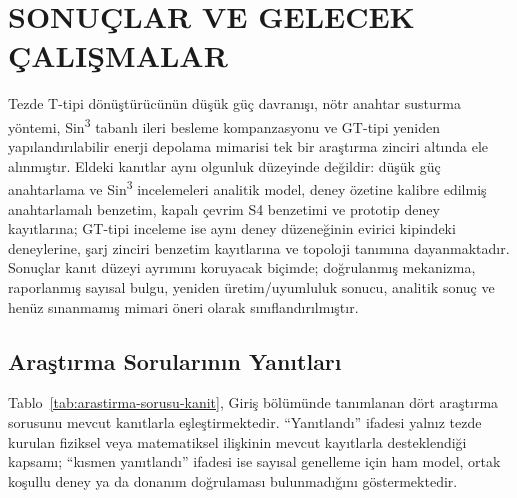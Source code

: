 \chapter{SONUÇLAR VE GELECEK ÇALIŞMALAR}
\label{chap:sonuc}

Tezde T-tipi dönüştürücünün düşük güç davranışı, nötr anahtar susturma yöntemi, Sin\textsuperscript{3} tabanlı ileri besleme kompanzasyonu ve GT-tipi yeniden yapılandırılabilir enerji depolama mimarisi tek bir araştırma zinciri altında ele alınmıştır. Eldeki kanıtlar aynı olgunluk düzeyinde değildir: düşük güç anahtarlama ve Sin\textsuperscript{3} incelemeleri analitik model, deney özetine kalibre edilmiş anahtarlamalı benzetim, kapalı çevrim S4 benzetimi ve prototip deney kayıtlarına; GT-tipi inceleme ise aynı deney düzeneğinin evirici kipindeki deneylerine, şarj zinciri benzetim kayıtlarına ve topoloji tanımına dayanmaktadır. Sonuçlar kanıt düzeyi ayrımını koruyacak biçimde; doğrulanmış mekanizma, raporlanmış sayısal bulgu, yeniden üretim/uyumluluk sonucu, analitik sonuç ve henüz sınanmamış mimari öneri olarak sınıflandırılmıştır.

\section{Araştırma Sorularının Yanıtları}

Tablo~\ref{tab:arastirma-sorusu-kanit}, Giriş bölümünde tanımlanan dört araştırma sorusunu mevcut kanıtlarla eşleştirmektedir. ``Yanıtlandı'' ifadesi yalnız tezde kurulan fiziksel veya matematiksel ilişkinin mevcut kayıtlarla desteklendiği kapsamı; ``kısmen yanıtlandı'' ifadesi ise sayısal genelleme için ham model, ortak koşullu deney ya da donanım doğrulaması bulunmadığını göstermektedir.

